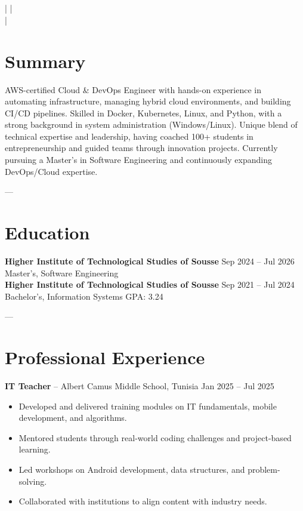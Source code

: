 \documentclass[a4paper,10pt]{article}
\begin{document}
\begin{center}
    {\LARGE \textbf{\FullName}} \\
    \Title \\
    \Phone \;|\; \href{mailto:\Email}{\Email} \;|\; \Location \\
    \LinkedIn \;|\; \GitHub
\end{center}

\section*{Summary}
AWS-certified Cloud \& DevOps Engineer with hands-on experience in automating infrastructure, managing hybrid cloud environments, and building CI/CD pipelines. Skilled in Docker, Kubernetes, Linux, and Python, with a strong background in system administration (Windows/Linux). Unique blend of technical expertise and leadership, having coached 100+ students in entrepreneurship and guided teams through innovation projects. Currently pursuing a Master’s in Software Engineering and continuously expanding DevOps/Cloud expertise.

---

\section*{Education}
\textbf{Higher Institute of Technological Studies of Sousse} \hfill Sep 2024 -- Jul 2026 \\
Master’s, Software Engineering \\

\textbf{Higher Institute of Technological Studies of Sousse} \hfill Sep 2021 -- Jul 2024 \\
Bachelor’s, Information Systems \hfill GPA: 3.24

---

\section*{Professional Experience}

\textbf{IT Teacher} -- Albert Camus Middle School, Tunisia \hfill Jan 2025 -- Jul 2025
\begin{itemize}[leftmargin=*]
    \item Developed and delivered training modules on IT fundamentals, mobile development, and algorithms.
    \item Mentored students through real-world coding challenges and project-based learning.
    \item Led workshops on Android development, data structures, and problem-solving.
    \item Collaborated with institutions to align content with industry needs.
\end{itemize}
\end{document}
